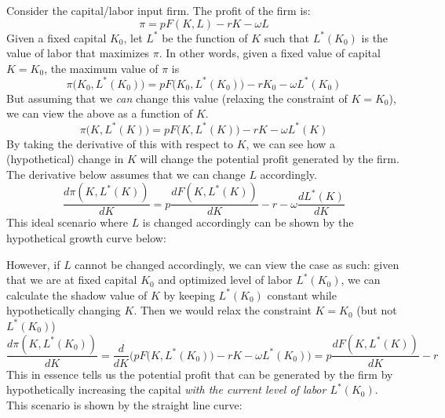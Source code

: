 \documentclass{article}
\begin{document}
      \begin{example}
        \label{ex:shadow-value-of-capital}
        Consider the capital/labor input firm. The profit of the firm is: 
        \begin{equation}
          \pi = p F(K, L) - r K - \omega L
        \end{equation}
        Given a fixed capital $K_0$, let $L^*$ be the function of $K$ such that $L^*(K_0)$ is the value of labor that maximizes $\pi$. In other words, given a fixed value of capital $K = K_0$, the maximum value of $\pi$ is
        \begin{equation}
          \pi\big(K_0, L^*(K_0)\big) = p F\big(K_0, L^*(K_0)\big) - r K_0 - \omega L^*(K_0)
        \end{equation}
        But assuming that we \textit{can} change this value (relaxing the constraint of $K = K_0$), we can view the above as a function of $K$. 
        \begin{equation}
          \pi\big(K, L^*(K)\big) = p F\big(K, L^*(K)\big) - r K - \omega L^*(K)
        \end{equation}
        By taking the derivative of this with respect to $K$, we can see how a (hypothetical) change in $K$ will change the potential profit generated by the firm. The derivative below assumes that we can change $L$ accordingly.
        \begin{equation}
          \frac{d \pi(K, L^* (K))}{d K} = p \frac{d F (K, L^*(K))}{d K} - r - \omega \frac{d L^*(K)}{dK}
        \end{equation}
        This ideal scenario where $L$ is changed accordingly can be shown by the hypothetical growth curve below: 
        \begin{center}
        \end{center}
        However, if $L$ cannot be changed accordingly, we can view the case as such: given that we are at fixed capital $K_0$ and optimized level of labor $L^*(K_0)$, we can calculate the shadow value of $K$ by keeping $L^*(K_0)$ constant while hypothetically changing $K$. Then we would relax the constraint $K=K_0$ (but not $L^* (K_0)$) 
        \begin{equation}
          \frac{d \pi (K, L^* (K_0))}{dK} = \frac{d}{dK} \bigg( p F\big(K, L^*(K_0)\big) - r K - \omega L^*(K_0) \bigg) = p \frac{d F (K, L^*(K))}{d K} - r
        \end{equation}
        This in essence tells us the potential profit that can be generated by the firm by hypothetically increasing the capital \textit{with the current level of labor $L^*(K_0)$}. This scenario is shown by the straight line curve: 
        \begin{center}
        \end{center}
      \end{example}
\end{document}
